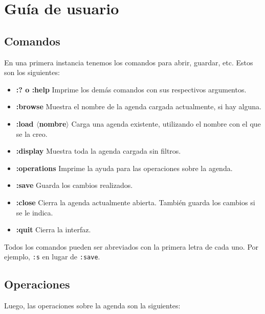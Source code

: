 \documentclass[a4paper,12pt]{article}
\begin{document}
  \section*{Guía de usuario}
  \subsection*{Comandos}
    En una primera instancia tenemos los comandos para abrir, guardar, etc. Estos son los siguientes:
    \begin{itemize}
      \item \textbf{:? o :help} Imprime los demás comandos con sus respectivos argumentos.
      \item \textbf{:browse} Muestra el nombre de la agenda cargada actualmente, si hay alguna.
      \item \textbf{:load $\langle$nombre$\rangle$} Carga una agenda existente, utilizando el nombre con el que se la creo.
      \item \textbf{:display} Muestra toda la agenda cargada sin filtros.
      \item \textbf{:operations} Imprime la ayuda para las operaciones sobre la agenda.
      \item \textbf{:save} Guarda los cambios realizados.
      \item \textbf{:close} Cierra la agenda actualmente abierta. También guarda los cambios si se le indica.
      \item \textbf{:quit} Cierra la interfaz.
    \end{itemize}
    Todos los comandos pueden ser abreviados con la primera letra de cada uno. Por ejemplo, \texttt{:s} en lugar de \texttt{:save}.

    \subsection*{Operaciones}
    Luego, las operaciones sobre la agenda son la siguientes:
\end{document}

